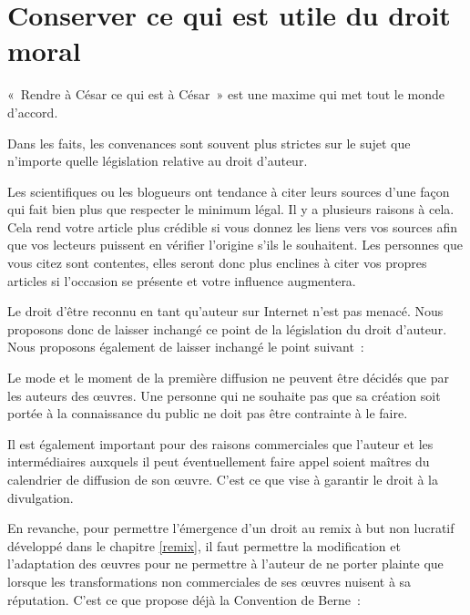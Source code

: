 \chapter{Conserver ce qui est utile du droit moral}\label{pater}

\begin{mesure}
 «~Rendre à César ce qui est à César~» est une maxime qui met tout le monde d’accord.
\end{mesure}

Dans les faits, les convenances sont souvent
plus strictes sur le sujet que n’importe quelle législation relative au droit d’auteur.

Les scientifiques ou les blogueurs ont tendance à citer leurs sources d’une façon qui fait bien plus que respecter le
minimum légal. Il y a plusieurs raisons à cela. Cela rend votre article plus crédible si vous donnez
les liens vers vos sources afin que vos lecteurs puissent en vérifier l’origine s'ils le
souhaitent. Les personnes que vous citez sont contentes, elles seront donc plus enclines à citer
vos propres articles si l’occasion se présente et votre influence augmentera. 

Le droit d’être reconnu en tant qu’auteur sur Internet n’est pas menacé. Nous proposons donc de
laisser inchangé ce point de la législation du droit d’auteur. Nous proposons également de laisser inchangé le point suivant~:

\begin{mesure}
Le mode et le moment de la première diffusion ne peuvent être décidés que par les auteurs des œuvres. Une personne qui ne souhaite pas que sa création soit portée à la connaissance du public ne doit pas être contrainte à le faire.  
\end{mesure}

Il est également important pour des raisons commerciales que l’auteur et les intermédiaires auxquels il peut éventuellement faire appel soient maîtres du calendrier de diffusion de son œuvre. C’est ce que vise à garantir le droit à la divulgation.

En revanche, pour permettre l'émergence d'un droit au remix à but non lucratif développé dans le chapitre \ref{remix}, il faut permettre la modification et l'adaptation des œuvres pour ne permettre à l'auteur de ne porter plainte que lorsque les transformations non commerciales de ses œuvres nuisent à sa réputation. C'est ce que propose déjà la Convention de Berne~:

